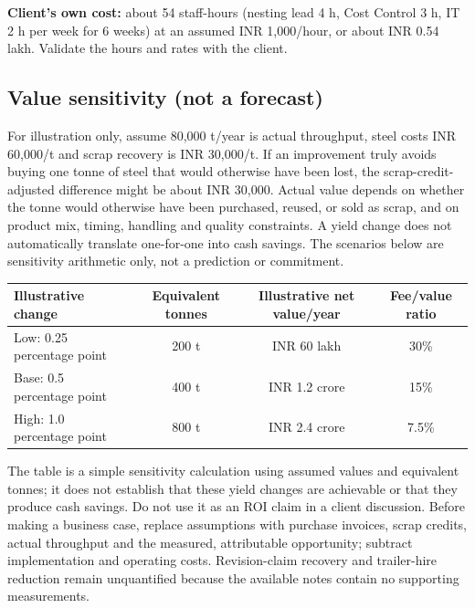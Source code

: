 \documentclass[10pt,a4paper]{article}
\begin{document}
\textbf{Client's own cost:} about 54 staff-hours (nesting lead 4 h, Cost Control 3 h, IT 2 h per week for 6 weeks) at an assumed INR 1{,}000/hour, or about INR 0.54 lakh. Validate the hours and rates with the client.

\subsection{Value sensitivity (not a forecast)}
For illustration only, assume 80{,}000 t/year is actual throughput, steel costs INR 60{,}000/t and scrap recovery is INR 30{,}000/t. If an improvement truly avoids buying one tonne of steel that would otherwise have been lost, the scrap-credit-adjusted difference might be about INR 30{,}000. Actual value depends on whether the tonne would otherwise have been purchased, reused, or sold as scrap, and on product mix, timing, handling and quality constraints. A yield change does not automatically translate one-for-one into cash savings. The scenarios below are sensitivity arithmetic only, not a prediction or commitment.

\small
\begin{tabular}{@{}lccc@{}}
\toprule
\textbf{Illustrative change} & \textbf{Equivalent tonnes} & \textbf{Illustrative net value/year} & \textbf{Fee/value ratio} \\
\midrule
Low: 0.25 percentage point & 200 t & INR 60 lakh & 30\% \\
Base: 0.5 percentage point & 400 t & INR 1.2 crore & 15\% \\
High: 1.0 percentage point & 800 t & INR 2.4 crore & 7.5\% \\
\bottomrule
\end{tabular}
\normalsize

The table is a simple sensitivity calculation using assumed values and equivalent tonnes; it does not establish that these yield changes are achievable or that they produce cash savings. Do not use it as an ROI claim in a client discussion. Before making a business case, replace assumptions with purchase invoices, scrap credits, actual throughput and the measured, attributable opportunity; subtract implementation and operating costs. Revision-claim recovery and trailer-hire reduction remain unquantified because the available notes contain no supporting measurements.

\end{document}
